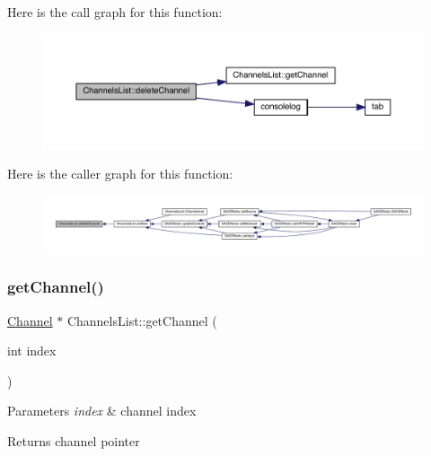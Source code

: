 Here is the call graph for this function\+:
\nopagebreak
\begin{figure}[H]
\begin{center}
\leavevmode
\includegraphics[width=350pt]{class_channels_list_a72dfd281e40fd29624354254ad3fa791_cgraph}
\end{center}
\end{figure}
Here is the caller graph for this function\+:
\nopagebreak
\begin{figure}[H]
\begin{center}
\leavevmode
\includegraphics[width=350pt]{class_channels_list_a72dfd281e40fd29624354254ad3fa791_icgraph}
\end{center}
\end{figure}
\mbox{\label{class_channels_list_a794574bee033fd0fa2bee54c615576f9}} 
\subsubsection{\texorpdfstring{get\+Channel()}{getChannel()}}
{\footnotesize\ttfamily \hyperlink{class_channel}{Channel} $\ast$ Channels\+List\+::get\+Channel (\begin{DoxyParamCaption}\item[{int}]{index }\end{DoxyParamCaption})}


\begin{DoxyParams}{Parameters}
{\em index} & channel index \\
\hline
\end{DoxyParams}
\begin{DoxyReturn}{Returns}
channel pointer 
\end{DoxyReturn}


